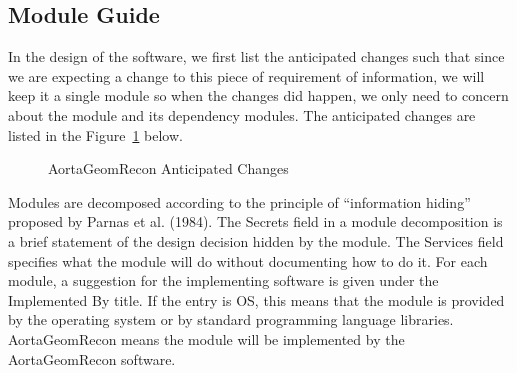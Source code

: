 \subsection{Module Guide}

In the design of the software, we first list the anticipated changes such that since we are expecting a change to this piece of requirement of information, we will keep it a single module so when the changes did happen, we only need to concern about the module and its dependency modules. The anticipated changes are listed in the Figure~\ref{fig_agr_ac} below.

\begin{figure}[H]
    \centering
    \caption[AortaGeomRecon Anticipated Changes]{AortaGeomRecon Anticipated Changes}
    \label{fig_agr_ac}
\end{figure}

Modules are decomposed according to the principle of “information hiding” proposed by Parnas et al. (1984). The Secrets field in a module decomposition is a brief statement of the design decision hidden by the module. The Services field specifies what the module will do without documenting how to do it. For each module, a suggestion for the implementing software is given under the Implemented By title. If the entry is OS, this means that the module is provided by the operating system or by standard programming language libraries. AortaGeomRecon means the module will be implemented by the AortaGeomRecon software.

